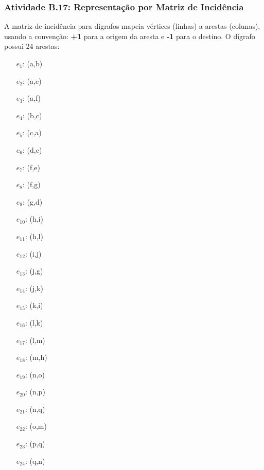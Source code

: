 \documentclass[a4paper,12pt]{article}
\begin{document}
\subsubsection*{Atividade B.17: Representação por Matriz de Incidência}
A matriz de incidência para dígrafos mapeia vértices (linhas) a arestas (colunas), usando a convenção: \textbf{+1} para a origem da aresta e \textbf{-1} para o destino. O dígrafo possui 24 arestas:
\begin{multicols}{4}
\begin{itemize}[nosep, leftmargin=*]
    \item[$e_1$:] (a,b) \item[$e_2$:] (a,e) \item[$e_3$:] (a,f) \item[$e_4$:] (b,c) \item[$e_5$:] (c,a) \item[$e_6$:] (d,c)
    \item[$e_7$:] (f,e) \item[$e_8$:] (f,g) \item[$e_9$:] (g,d) \item[$e_{10}$:] (h,i) \item[$e_{11}$:] (h,l) \item[$e_{12}$:] (i,j)
    \item[$e_{13}$:] (j,g) \item[$e_{14}$:] (j,k) \item[$e_{15}$:] (k,i) \item[$e_{16}$:] (l,k) \item[$e_{17}$:] (l,m) \item[$e_{18}$:] (m,h)
    \item[$e_{19}$:] (n,o) \item[$e_{20}$:] (n,p) \item[$e_{21}$:] (n,q) \item[$e_{22}$:] (o,m) \item[$e_{23}$:] (p,q) \item[$e_{24}$:] (q,n)
\end{itemize}
\end{multicols}
\end{document}
